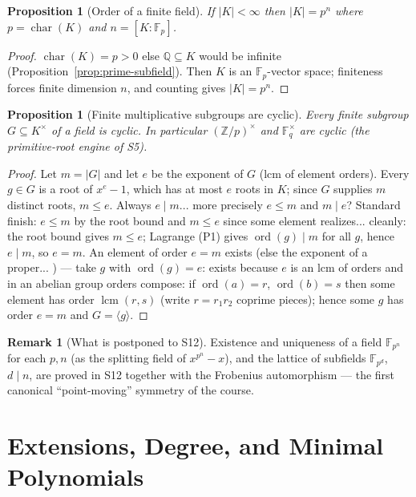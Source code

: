 \documentclass[11pt,a4paper]{article}
\newtheorem{proposition}[theorem]{Proposition}
\theoremstyle{definition}
\newtheorem{remark}[theorem]{Remark}
\newcommand{\Z}{\mathbb{Z}}
\newcommand{\Q}{\mathbb{Q}}
\newcommand{\F}{\mathbb{F}}
\newcommand{\ch}{\operatorname{char}}
\newcommand{\ord}{\operatorname{ord}}
\begin{document}
\begin{proposition}[Order of a finite field]\label{prop:ff-order}
If $|K|<\infty$ then $|K|=p^n$ where $p=\ch(K)$ and $n=[K:\F_p]$.
\end{proposition}
\begin{proof}
$\ch(K)=p>0$ else $\Q\subseteq K$ would be infinite (Proposition~\ref{prop:prime-subfield}).
Then $K$ is an $\F_p$-vector space; finiteness forces finite dimension $n$, and counting gives
$|K|=p^n$.
\end{proof}

\begin{proposition}[Finite multiplicative subgroups are cyclic]\label{prop:finite-cyclic}
Every finite subgroup $G\subseteq K^\times$ of a field is cyclic. In particular
$(\Z/p)^\times$ and $\F_q^\times$ are cyclic (the primitive-root engine of S5).
\end{proposition}
\begin{proof}
Let $m=|G|$ and let $e$ be the exponent of $G$ (lcm of element orders). Every $g\in G$ is a root of
$x^e-1$, which has at most $e$ roots in $K$; since $G$ supplies $m$ distinct roots, $m\le e$. Always
$e\mid m$... more precisely $e\le m$ and $m\mid e$? Standard finish: $e\le m$ by the root bound and
$m\le e$ since some element realizes... cleanly: the root bound gives $m\le e$; Lagrange (P1) gives
$\ord(g)\mid m$ for all $g$, hence $e\mid m$, so $e=m$. An element of order $e=m$ exists (else the
exponent of a proper... ) --- take $g$ with $\ord(g)=e$: exists because $e$ is an lcm of orders and
in an abelian group orders compose: if $\ord(a)=r$, $\ord(b)=s$ then some element has order
$\operatorname{lcm}(r,s)$ (write $r=r_1r_2$ coprime pieces); hence some $g$ has order $e=m$ and
$G=\langle g\rangle$.
\end{proof}

\begin{remark}[What is postponed to S12]
Existence and uniqueness of a field $\F_{p^n}$ for each $p,n$ (as the splitting field of
$x^{p^n}-x$), and the lattice of subfields $\F_{p^d}$, $d\mid n$, are proved in S12 together with
the Frobenius automorphism --- the first canonical ``point-moving'' symmetry of the course.
\end{remark}

\section{Extensions, Degree, and Minimal Polynomials}
\end{document}
